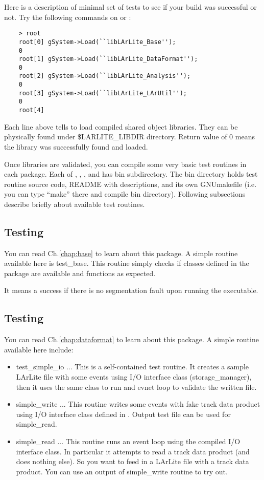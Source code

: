 
Here is a description of minimal set of tests to see if your build was successful or not. Try the following commands on \CINT or \PyROOT:
\begin{lstlisting}
    > root
    root[0] gSystem->Load(``libLArLite_Base'');
    0
    root[1] gSystem->Load(``libLArLite_DataFormat'');
    0
    root[2] gSystem->Load(``libLArLite_Analysis'');
    0
    root[3] gSystem->Load(``libLArLite_LArUtil'');
    0
    root[4] 
\end{lstlisting}
Each line above tells \CINT to load compiled shared object libraries. 
They can be physically found under {\ttfamily \$LARLITE\_LIBDIR} directory. 
Return value of 0 means the library was successfully found and loaded.

Once libraries are validated, you can compile some very basic test routines in each package.
Each of \Base, \DataFormat, \Analysis, and \LArUtil has {\ttfamily bin} subdirectory. 
The {\ttfamily bin} directory holds test routine source code, README with descriptions, and 
its own GNUmakefile (i.e. you can type ``make'' there and compile {\ttfamily bin} directory). 
Following subsections describe briefly about available test routines.

\subsection{Testing \Base}
You can read Ch.\ref{chap:base} to learn about this package.
A simple routine available here is {\ttfamily test\_base}. This routine simply checks if \CPP
classes defined  in the package are available and functions as expected. 

It means a success if there is no segmentation fault upon running the executable.

\subsection{Testing \DataFormat}
You can read Ch.\ref{chap:dataformat} to learn about this package.
A simple routine available here include:
\begin{itemize}
\item {\ttfamily test\_simple\_io} ... This is a self-contained test routine. It creates a sample LArLite
\ROOT file with some events using I/O interface class ({\ttfamily storage\_manager}), then
it uses the same class to run and evnet loop to validate the written file. 
\item {\ttfamily simple\_write} ... This routine writes some events with fake track data product using 
I/O interface class defined in \DataFormat. Output test file can be used for {\ttfamily simple\_read}.
\item {\ttfamily simple\_read} ... This routine runs an event loop using the compiled I/O interface class.
In particular it attempts to read a track data product (and does nothing else). So you want to feed in
a LArLite \ROOT file with a track data product. You can use an output of {\ttfamily simple\_write} routine
to try out.                                       
\end{itemize}

